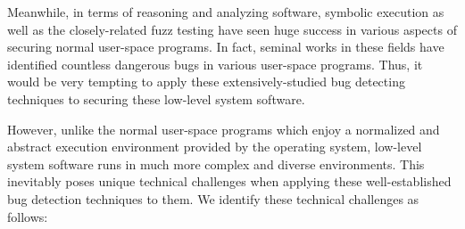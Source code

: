 Meanwhile, in terms of reasoning and analyzing software, symbolic execution as well as the closely-related fuzz testing have seen huge success in various aspects of securing normal user-space programs. 
In fact, seminal works  in these fields have identified countless dangerous bugs in various user-space programs. 
Thus, it would be very tempting to apply these extensively-studied bug detecting techniques to securing these low-level system software. 



However, unlike the normal user-space programs which enjoy a normalized and abstract execution environment provided by the operating system, low-level system software runs in much more complex and diverse environments. 
This inevitably poses unique technical challenges when applying these well-established bug detection techniques to them. 
We identify these technical challenges as follows: 

